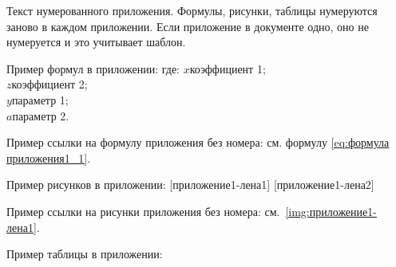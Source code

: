 \newpage{}
\setcounter{equation}{0} %
\setcounter{table}{0} %
\setcounter{illustration}{0} %

Текст нумерованного приложения. Формулы, рисунки, таблицы нумеруются заново в каждом приложении. Если приложение в документе одно, оно не нумеруется и это учитывает шаблон.

Пример формул в приложении:
%
\noindent где: $x$\ndash коэффициент 1; \\
\indent $z$\ndash коэффициент 2;\\
\indent $y$\ndash параметр 1;\\
\indent $a$\ndash параметр 2.

Пример ссылки на формулу приложения без номера: см. формулу \ref{eq:формула приложения1_1}.

Пример рисунков в приложении:
[приложение1-лена1]
[приложение1-лена2]

Пример ссылки на рисунки приложения без номера: см.~\ref{img:приложение1-лена1}.

\newpage
Пример таблицы в приложении:

